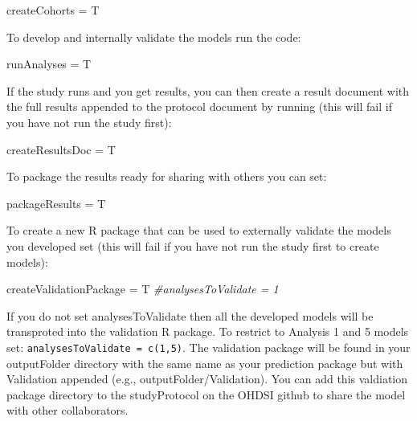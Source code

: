 \documentclass[
]{article}
\newenvironment{Shaded}{\begin{snugshade}}{\end{snugshade}}
\newcommand{\CommentTok}[1]{\textcolor[rgb]{0.56,0.35,0.01}{\textit{#1}}}
\newcommand{\NormalTok}[1]{#1}
\newcommand{\StringTok}[1]{\textcolor[rgb]{0.31,0.60,0.02}{#1}}
\begin{document}
\begin{Shaded}
\begin{Highlighting}[]
\NormalTok{    createCohorts =}\StringTok{ }\NormalTok{T}
\end{Highlighting}
\end{Shaded}

To develop and internally validate the models run the code:

\begin{Shaded}
\begin{Highlighting}[]
\NormalTok{    runAnalyses =}\StringTok{ }\NormalTok{T}
\end{Highlighting}
\end{Shaded}

If the study runs and you get results, you can then create a result
document with the full results appended to the protocol document by
running (this will fail if you have not run the study first):

\begin{Shaded}
\begin{Highlighting}[]
\NormalTok{    createResultsDoc =}\StringTok{ }\NormalTok{T}
\end{Highlighting}
\end{Shaded}

To package the results ready for sharing with others you can set:

\begin{Shaded}
\begin{Highlighting}[]
\NormalTok{    packageResults =}\StringTok{ }\NormalTok{T}
\end{Highlighting}
\end{Shaded}

To create a new R package that can be used to externally validate the
models you developed set (this will fail if you have not run the study
first to create models):

\begin{Shaded}
\begin{Highlighting}[]
\NormalTok{    createValidationPackage =}\StringTok{ }\NormalTok{T  }
    \CommentTok{#analysesToValidate = 1}
\end{Highlighting}
\end{Shaded}

If you do not set analysesToValidate then all the developed models will
be transproted into the validation R package. To restrict to Analysis 1
and 5 models set: \texttt{analysesToValidate\ =\ c(1,5)}. The validation
package will be found in your outputFolder directory with the same name
as your prediction package but with Validation appended (e.g.,
outputFolder/Validation). You can add this valdiation package directory
to the studyProtocol on the OHDSI github to share the model with other
collaborators.
\end{document}
